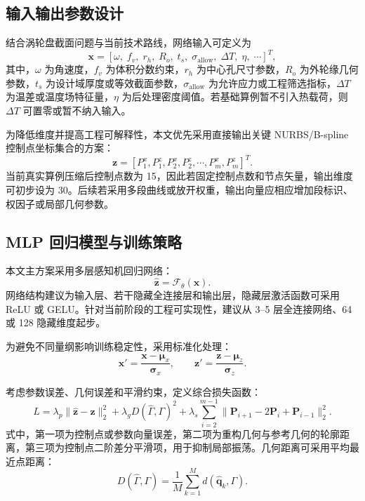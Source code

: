 \documentclass{FRB-style}
\begin{document}
\subsection{输入输出参数设计}

结合涡轮盘截面问题与当前技术路线，网络输入可定义为
\begin{equation}
\mathbf{x}=[\omega,\;f_v,\;r_h,\;R_o,\;t_s,\;\sigma_{\mathrm{allow}},\;\Delta T,\;\eta,\;\cdots]^T,
\end{equation}
其中，$\omega$ 为角速度，$f_v$ 为体积分数约束，$r_h$ 为中心孔尺寸参数，$R_o$ 为外轮缘几何参数，$t_s$ 为设计域厚度或等效截面参数，$\sigma_{\mathrm{allow}}$ 为允许应力或工程筛选指标，$\Delta T$ 为温差或温度场特征量，$\eta$ 为后处理密度阈值。若基础算例暂不引入热载荷，则 $\Delta T$ 可置零或暂不纳入输入。

为降低维度并提高工程可解释性，本文优先采用直接输出关键 NURBS/B-spline 控制点坐标集合的方案：
\begin{equation}
\mathbf{z}=[P_1^x,P_1^z,P_2^x,P_2^z,\cdots,P_m^x,P_m^z]^T.
\end{equation}
当前真实算例压缩后控制点数为 15，因此若固定控制点数和节点矢量，输出维度可初步设为 30。后续若采用多段曲线或放开权重，输出向量应相应增加段标识、权因子或局部几何参数。

\subsection{MLP 回归模型与训练策略}

本文主方案采用多层感知机回归网络：
\begin{equation}
\hat{\mathbf{z}}=\mathcal{F}_{\theta}(\mathbf{x}).
\end{equation}
网络结构建议为输入层、若干隐藏全连接层和输出层，隐藏层激活函数可采用 ReLU 或 GELU。针对当前阶段的工程可实现性，建议从 3--5 层全连接网络、64 或 128 隐藏维度起步。

为避免不同量纲影响训练稳定性，采用标准化处理：
\begin{equation}
\mathbf{x}'=\frac{\mathbf{x}-\boldsymbol{\mu}_x}{\boldsymbol{\sigma}_x},\qquad
\mathbf{z}'=\frac{\mathbf{z}-\boldsymbol{\mu}_z}{\boldsymbol{\sigma}_z}.
\end{equation}

考虑参数误差、几何误差和平滑约束，定义综合损失函数：
\begin{equation}
L=\lambda_p\|\hat{\mathbf{z}}-\mathbf{z}\|_2^2+
\lambda_gD(\hat{\Gamma},\Gamma)^2+
\lambda_s\sum_{i=2}^{m-1}\|\mathbf{P}_{i+1}-2\mathbf{P}_i+\mathbf{P}_{i-1}\|_2^2.
\end{equation}
式中，第一项为控制点或参数向量误差，第二项为重构几何与参考几何的轮廓距离，第三项为控制点二阶差分平滑项，用于抑制局部振荡。几何距离可采用平均最近点距离：
\begin{equation}
D(\hat{\Gamma},\Gamma)=\frac{1}{M}\sum_{k=1}^{M}d(\hat{\mathbf{q}}_k,\Gamma).
\end{equation}
\end{document}
